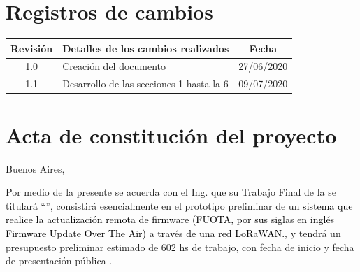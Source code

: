 \documentclass[11pt]{charter}
\begin{document}
\maketitle
\thispagestyle{empty}
\pagebreak


\thispagestyle{empty}
{\setlength{\parskip}{0pt}
\tableofcontents{}
}
\pagebreak


\section{Registros de cambios}
\label{sec:registro}


\begin{table}[ht]
\label{tab:registro}
\centering

\begin{tabularx}{\linewidth}{@{}|c|X|c|@{}}
\hline
\rowcolor[HTML]{C0C0C0} 
Revisión & \multicolumn{1}{c|}{\cellcolor[HTML]{C0C0C0}Detalles de los cambios realizados} & Fecha      \\ \hline
1.0      & Creación del documento                                                          & 27/06/2020 \\ \hline
1.1      & Desarrollo de las secciones 1 hasta la 6										   & 09/07/2020 \\ \hline
\end{tabularx}
\end{table}

\pagebreak



\section{Acta de constitución del proyecto}
\label{sec:acta}

\begin{flushright}
Buenos Aires, \fechaInicioName
\end{flushright}

\vspace{2cm}

Por medio de la presente se acuerda con el Ing. \authorname\hspace{1px} que su Trabajo Final de la \degreename\hspace{1px} se titulará ``\ttitle'', consistirá esencialmente en el prototipo preliminar de un \textcolor{black}{sistema que realice la actualización remota de firmware (FUOTA, por sus siglas en inglés Firmware Update Over The Air) a través de una red LoRaWAN.}, y tendrá un presupuesto preliminar estimado de 602 hs de trabajo, con fecha de inicio \fechaInicioName\hspace{1px} y fecha de presentación pública \fechaFinalName.
\end{document}
